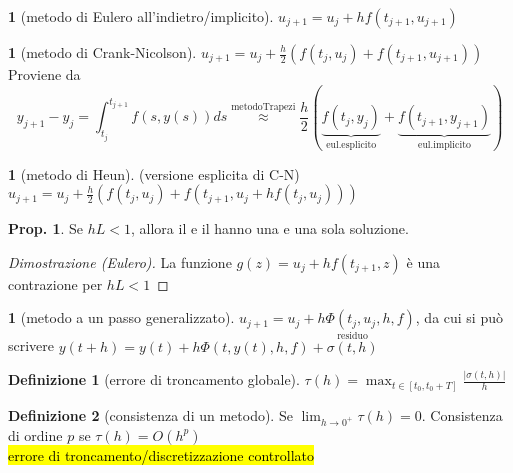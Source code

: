 \documentclass[a4paper,10pt]{article}
\theoremstyle{definition}
\theoremstyle{indentdefinition}
\newtheorem{defn}{Definizione}[section]
\theoremstyle{indenttheorem}
\newtheorem{prop}{Prop.}
\theoremstyle{myremark}
\theoremstyle{indentgeneral}
\newtheorem{lyxalgorithm}[thm]{\protect\algorithmname}
\theoremstyle{plain}
\theoremstyle{plain}
\begin{document}
\begin{lyxalgorithm}[metodo di Eulero all'indietro/implicito]
\label{alg:metodo-eulero-indietro}$u_{j+1}=u_{j}+hf\left(t_{j+1},u_{j+1}\right)$
\end{lyxalgorithm}

\begin{lyxalgorithm}[metodo di Crank-Nicolson]
\label{alg:metodo-Crank-Nicolson}$u_{j+1}=u_{j}+\frac{h}{2}\left(f\left(t_{j},u_{j}\right)+f\left(t_{j+1},u_{j+1}\right)\right)$ \\
Proviene da $$y_{j+1}-y_j=\int_{t_j}^{t_{j+1}}f(s,y(s))ds\overset{\text{metodoTrapezi}}{\approx} \frac{h}{2}(\underbrace{f(t_j,y_j)}_{\text{eul.esplicito}}+\underbrace{f(t_{j+1},y_{j+1})}_{\text{eul.implicito}})$$
\end{lyxalgorithm}

\begin{lyxalgorithm}[metodo di Heun] (versione esplicita di C-N)
\label{alg:metodo-Heun}$u_{j+1}=u_{j}+\frac{h}{2}\left(f\left(t_{j},u_{j}\right)+f\left(t_{j+1},u_{j}+hf\left(t_{j},u_{j}\right)\right)\right)$
\end{lyxalgorithm}

\begin{prop}
Se $hL<1$, allora il  e il 
hanno una e una sola soluzione.
\end{prop}

\begin{proof}[Dimostrazione (Eulero)]
La funzione $g\left(z\right)=u_{j}+hf\left(t_{j+1},z\right)$ è una
contrazione per $hL<1$
\end{proof}
\begin{lyxalgorithm}[metodo a un passo generalizzato]
$u_{j+1}=u_{j}+h\Phi\left(t_{j},u_{j},h,f\right)$, da cui si può
scrivere $y\left(t+h\right)=y\left(t\right)+h\Phi\left(t,y\left(t\right),h,f\right)+\overset{\text{residuo}}{\sigma\left(t,h\right)}$
\end{lyxalgorithm}

\begin{defn}[errore di troncamento globale]
$\tau\left(h\right)=\max_{t\in\left[t_{0},t_{0}+T\right]}\frac{\left|\sigma\left(t,h\right)\right|}{h}$
\end{defn}

\begin{defn}[consistenza di un metodo]
\label{def:consistenza-di-un-metodo}Se $\lim_{h\rightarrow0^{+}}\tau\left(h\right)=0$.
Consistenza di ordine $p$ se $\tau\left(h\right)=O\left(h^{p}\right)$\\
\hl{errore di troncamento/discretizzazione controllato}
\end{defn}
\end{document}
